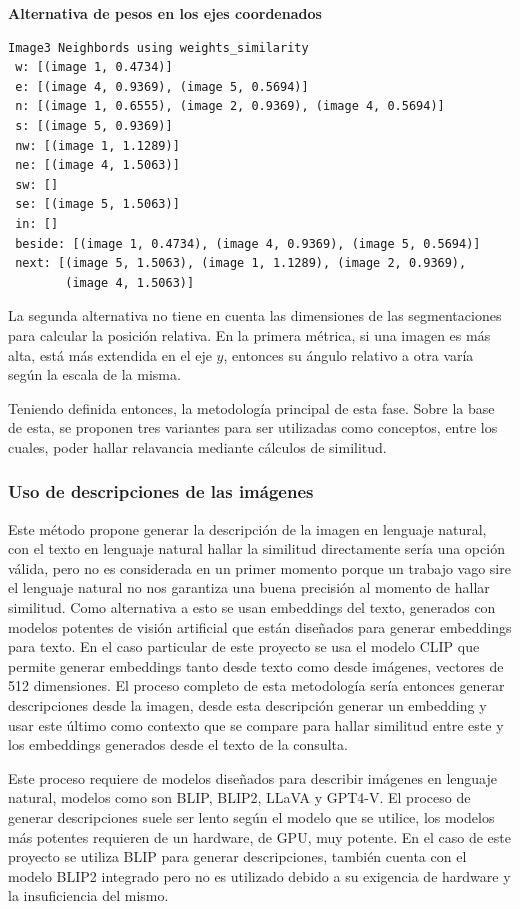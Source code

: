 \noindent\textbf{Alternativa de pesos en los ejes coordenados}
\begin{verbatim}
Image3 Neighbords using weights_similarity
 w: [(image 1, 0.4734)]
 e: [(image 4, 0.9369), (image 5, 0.5694)]
 n: [(image 1, 0.6555), (image 2, 0.9369), (image 4, 0.5694)]
 s: [(image 5, 0.9369)]
 nw: [(image 1, 1.1289)]
 ne: [(image 4, 1.5063)]
 sw: []
 se: [(image 5, 1.5063)]
 in: []
 beside: [(image 1, 0.4734), (image 4, 0.9369), (image 5, 0.5694)]
 next: [(image 5, 1.5063), (image 1, 1.1289), (image 2, 0.9369),
        (image 4, 1.5063)]
\end{verbatim}
La segunda alternativa no tiene en cuenta las dimensiones de las segmentaciones para calcular la posición relativa. En la primera métrica, si una imagen es más alta, est\'a más extendida en el eje $y$, entonces su ángulo relativo a otra varía según la escala de la misma.

Teniendo definida entonces, la metodolog\'ia principal de esta fase. Sobre la base de esta, se proponen tres variantes para ser utilizadas como conceptos, entre los cuales, poder hallar relavancia mediante cálculos de similitud.

\subsubsection*{Uso de descripciones de las imágenes}
Este método propone generar la descripción de la imagen en lenguaje natural, con el texto en lenguaje natural hallar la similitud directamente sería una opción válida, pero no es considerada en un primer momento porque un trabajo vago sire el lenguaje natural no nos garantiza una buena precisión al momento de hallar similitud. Como alternativa a esto se usan embeddings del texto, generados con modelos potentes de visión artificial que están diseñados para generar embeddings para texto. En el caso particular de este proyecto se usa el modelo CLIP que permite generar embeddings tanto desde texto como desde imágenes, vectores de 512 dimensiones. El proceso completo de esta metodología sería entonces generar descripciones desde la imagen, desde esta descripción generar un embedding y usar este último como contexto que se compare para hallar similitud entre este y los embeddings generados desde el texto de la consulta.

Este proceso requiere de modelos diseñados para describir imágenes en lenguaje natural, modelos como son BLIP, BLIP2, LLaVA y GPT4-V. El proceso de generar descripciones suele ser lento según el modelo que se utilice, los modelos más potentes requieren de un hardware, de GPU, muy potente. En el caso de este proyecto se utiliza BLIP para generar descripciones, también cuenta con el modelo BLIP2 integrado pero no es utilizado debido a su exigencia de hardware y la insuficiencia del mismo.

